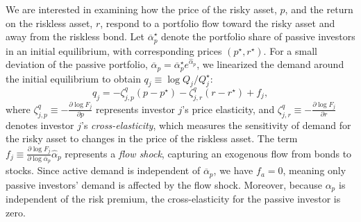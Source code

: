 We are interested in examining how the price of the risky asset, $p$, and the return on the riskless asset, $r$, respond to a portfolio flow toward the risky asset and away from the riskless bond. Let $\overline{\alpha}_p^\star$ denote the portfolio share of passive investors in an initial equilibrium, with corresponding prices  $(p^\star, r^\star)$. 
For a small deviation of the passive portfolio, $\overline{\alpha}_p = \overline{\alpha}_p^\star e^{\hat{\alpha}_p}$, we linearized the demand around the initial equilibrium to obtain $q_j \equiv \log Q_j / Q_j^\star$:
\begin{equation}
    q_j = - \zeta_{j,p}^q (p -p^\star) - \zeta_{j,r}^q (r -r^\star) + f_j,
\end{equation}
where $\zeta_{j,p}^q \equiv - \frac{\partial \log F_j}{\partial p}$ represents investor $j$'s price elasticity, and $\zeta_{j,r}^q \equiv - \frac{\partial \log F_j}{\partial r}$ denotes investor $j$'s \textit{cross-elasticity}, which measures the sensitivity of demand for the risky asset to changes in the price of the riskless asset.
The term $f_j \equiv \frac{\partial \log F_j}{\partial \log \overline{\alpha}_p} \hat{\alpha}_p$ represents a \textit{flow shock}, capturing an exogenous flow from bonds to stocks.
Since active demand is independent of $\overline{\alpha}_p$, we have $f_a = 0$, meaning only passive investors' demand is affected by the flow shock.
Moreover, because $\alpha_{p}$ is independent of the risk premium, the cross-elasticity for the passive investor is zero.



